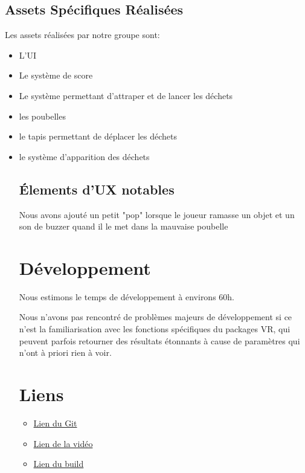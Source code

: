 \documentclass[a4paper,french,12pt]{article}
\begin{document}
\subsection{Assets Spécifiques Réalisées}

Les assets réalisées par notre groupe sont:
\begin{itemize}
\item L'UI
\item Le système de score
\item Le système permettant d'attraper et de lancer les déchets
\item les poubelles
\item le tapis permettant de déplacer les déchets
\item le système d'apparition des déchets

\subsection{Élements d'UX notables}

Nous avons ajouté un petit "pop" lorsque le joueur ramasse un objet et un son de buzzer quand il le met dans la mauvaise poubelle

\section{Développement}

Nous estimons le temps de développement à environs 60h.

Nous n'avons pas rencontré de problèmes majeurs de développement si ce n'est la familiarisation avec les fonctions spécifiques du packages VR, qui peuvent parfois retourner des résultats étonnants à cause de paramètres qui n'ont à priori rien à voir.

\section{Liens}
\begin{itemize}
\item \href{https://github.com/MartinFond/Projet_RV}{Lien du Git}

\item \href{https://drive.google.com/file/d/14MIBjIZLIeK-ba-3iSjfn7IGKH1ggph4/view}{Lien de la vidéo}

\item \href{https://drive.google.com/file/d/1eOpNpBAcrODsFzoDIm0bHvClpjSXFn5u/view?usp=sharing}{Lien du build}
\end{itemize}

\end{itemize}
\end{document}
